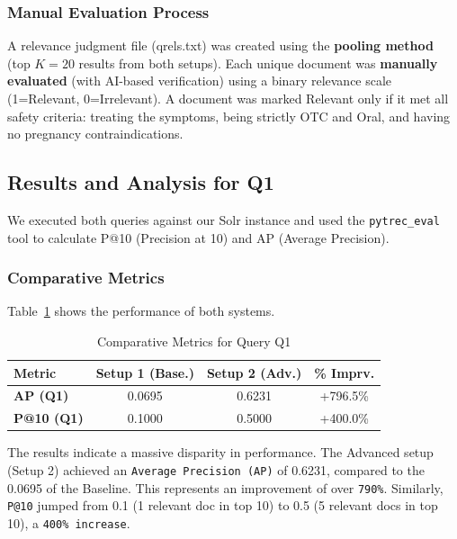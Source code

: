 \subsubsection{Manual Evaluation Process}
A relevance judgment file (qrels.txt) was created using the \textbf{pooling method} (top $K=20$ results from both setups). Each unique document was \textbf{manually evaluated} (with AI-based verification) using a binary relevance scale (1=Relevant, 0=Irrelevant). A document was marked Relevant only if it met all safety criteria: treating the symptoms, being strictly OTC and Oral, and having no pregnancy contraindications.

\subsection{Results and Analysis for Q1}
We executed both queries against our Solr instance and used the \texttt{pytrec\_eval} tool to calculate P@10 (Precision at 10) and AP (Average Precision).

\subsubsection{Comparative Metrics}
Table~\ref{tab:q1results} shows the performance of both systems.

\begin{table}[htbp]
    \centering
    \caption{Comparative Metrics for Query Q1}
    \label{tab:q1results}
    \begin{tabular}{l c c c}
        \hline
        \textbf{Metric}    & \textbf{Setup 1 (Base.)} & \textbf{Setup 2 (Adv.)} & \textbf{\% Imprv.} \\
        \hline
        \textbf{AP (Q1)}   & 0.0695                   & 0.6231                  & +796.5\%           \\
        \textbf{P@10 (Q1)} & 0.1000                   & 0.5000                  & +400.0\%           \\
        \hline
    \end{tabular}
\end{table}

The results indicate a massive disparity in performance. The Advanced setup (Setup 2) achieved an \texttt{Average Precision (AP)} of 0.6231, compared to the 0.0695 of the Baseline. This represents an improvement of over \texttt{790\%}. Similarly, \texttt{P@10} jumped from 0.1 (1 relevant doc in top 10) to 0.5 (5 relevant docs in top 10), a \texttt{400\% increase}.

